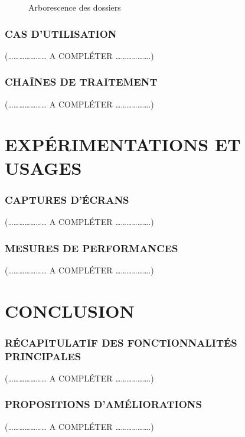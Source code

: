 \documentclass[a4paper]{article} %
\begin{document}
\begin{figure}[h]
\begin{center}
\end{center}
\caption{Arborescence des dossiers}
\end{figure}


\subsubsection{ CAS D’UTILISATION}

(………………… A COMPLÉTER ……………….)

\subsubsection{CHAÎNES DE TRAITEMENT }

(………………… A COMPLÉTER ……………….)


\section{EXPÉRIMENTATIONS ET USAGES }
\subsubsection{CAPTURES D’ÉCRANS }


(………………… A COMPLÉTER ……………….)

\subsubsection{ MESURES DE PERFORMANCES }

(………………… A COMPLÉTER ……………….)

\section{CONCLUSION}
\subsubsection{RÉCAPITULATIF DES FONCTIONNALITÉS PRINCIPALES }

(………………… A COMPLÉTER ……………….)
\subsubsection{PROPOSITIONS D’AMÉLIORATIONS }

(………………… A COMPLÉTER ……………….)
\end{document}
